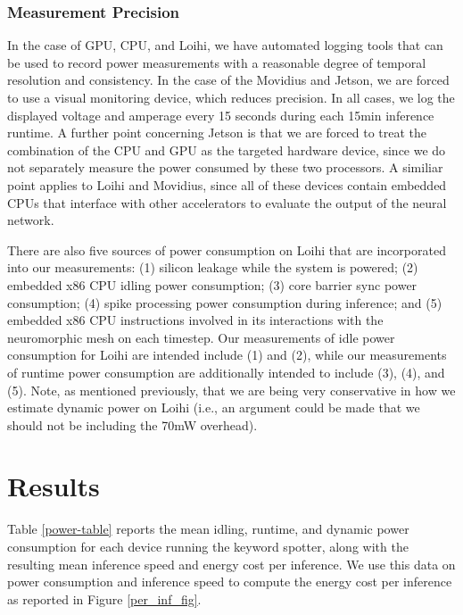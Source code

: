 \documentclass[sigconf, screen]{acmart}
\begin{document}
\subsubsection{Measurement Precision}

In the case of GPU, CPU, and Loihi, we have automated logging tools that can be used to record power measurements with a reasonable degree of temporal resolution and consistency. In the case of the Movidius and Jetson, we are forced to use a visual monitoring device, which reduces precision. In all cases, we log the displayed voltage and amperage every 15 seconds during each 15min inference runtime. A further point concerning Jetson is that we are forced to treat the combination of the CPU and GPU as the targeted hardware device, since we do not separately measure the power consumed by these two processors. A similiar point applies to Loihi and Movidius, since all of these devices contain embedded CPUs that interface with other accelerators to evaluate the output of the neural network.

There are also five sources of power consumption on Loihi that are incorporated into our measurements: (1) silicon leakage while the system is powered; (2) embedded x86 CPU idling power consumption; (3) core barrier sync power consumption; (4) spike processing power consumption during inference; and (5) embedded x86 CPU instructions involved in its interactions with the neuromorphic mesh on each timestep. Our measurements of idle power consumption for Loihi are intended include (1) and (2), while our measurements of runtime power consumption are additionally intended to include (3), (4), and (5). Note, as mentioned previously, that we are being very conservative in how we estimate dynamic power on Loihi (i.e., an argument could be made that we should not be including the 70mW overhead).

\section{Results} 
 
Table \ref{power-table} reports the mean idling, runtime, and dynamic power consumption for each device running the keyword spotter, along with the resulting mean inference speed and energy cost per inference. We use this data on power consumption and inference speed to compute the energy cost per inference as reported in Figure \ref{per_inf_fig}.
\end{document}
